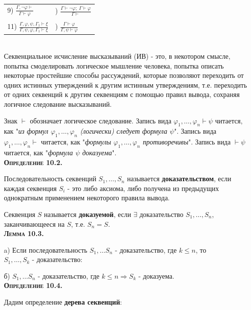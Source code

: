 \documentclass[18pt, a4paper]{extarticle}
\newcommand{\lot}[3]{#1_#2,\dots,#1_#3}
\newcommand{\Gm}{\Gamma}
\newcommand{\vp}{\varphi}
\newcommand{\vd}{\vdash}
\begin{document}
\begin{tabular}{ll}
    9) $\displaystyle \frac{\Gm,\lnot \varphi \vdash}{\Gm\vdash\varphi}$ & \qquad
    10) $\displaystyle \frac{\Gm\vdash\lnot\varphi;\;\Gm\vdash\varphi}{\Gm\vdash}$
    \\\\
    11) $\displaystyle \frac{\Gm,\varphi,\psi,\Gm_1 \vdash \xi}{\Gm,\psi,\varphi,\Gm_1 \vdash \xi}$ & \qquad
    12) $\displaystyle \frac{\Gm\vdash\varphi}{\Gm,\psi\vdash\varphi}$
\end{tabular}\leavevmode\\

Секвенциальное исчисление высказываний (ИВ) - это, в некотором смысле, попытка смоделировать логическое мышление человека, попытка описать некоторые простейшие способы рассуждений, которые позволяют переходить от одних истинных утверждений к другим истинным утверждениям, т.е. переходить от одних секвенций к другим секвенциям с помощью правил вывода, сохраняя логичное следование высказываний.

Знак $\vd$ обозначает логическое следование. Запись вида $\lot \vp 1 n\vd\psi$ читается, как "\textit{из формул $\lot \vp 1 n$ (логически) следует формула $\psi$}"{}. Запись вида $\lot \vp 1 n\vd$ читается, как "\textit{формулы $\lot \vp 1 n$ противоречивы}"{}. Запись вида $\vd\psi$ читается, как "\textit{формула $\psi$ доказуема}"{}.\\

\textbf{\textsc{Определение 10.2.}} 

Последовательность секвенций $S_1,\ldots,S_n$ называется \textbf{доказательством}, если каждая секвенция $S_i$ -  это либо аксиома, либо получена из предыдущих однократным применением некоторого правила вывода.

Секвенция $S$ называется \textbf{доказуемой}, если $\exists$ доказательство $S_1,\ldots,S_n$, заканчивающееся на $S$, т.е. $S_n = S$.\\

\textbf{\textsc{Лемма 10.3.}}

a) Если последовательность $S_1,\ldots S_n$ -  доказательство, где $k\leqslant n$, то\\ $S_1,\ldots,S_k$ -  доказательство:

б) $S_1,\ldots S_n$ -  доказательство, где $k\leqslant n \Rightarrow S_k$ -  доказуема.\\

\textbf{\textsc{Определение 10.4.}}

Дадим определение \textbf{дерева секвенций}:
\end{document}
